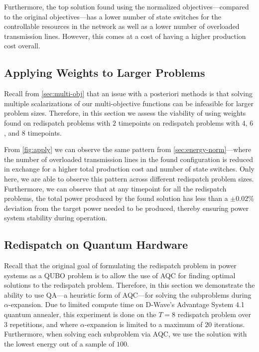 \documentclass[conference]{IEEEtran}
\makeatletter
\newcommand{\QUBO}{\textsc{QUBO}\@\xspace}
\makeatother
\begin{document}
Furthermore, the top solution found using the normalized
objectives---compared to the original objectives---has a lower number of
state switches for the controllable resources in the network as well as
a lower number of overloaded transmission lines. However, this comes at
a cost of having a higher production cost overall.

\subsection{Applying Weights to Larger Problems}\label{sec:SimBench}
Recall from \cref{sec:multi-obj} that an issue with a posteriori methods
is that solving multiple scalarizations of our multi-objective functions
can be infeasible for larger problem sizes. Therefore, in this section we
assess the viability of using weights found on redispatch problems
with $2$ timepoints on redispatch problems with $4$, $6$, and $8$
timepoints.

From \cref{fig:apply} we can observe the same pattern from
\cref{sec:energy-norm}---where the number of overloaded transmission
lines in the found configuration is reduced in exchange for a higher
total production cost and number of state switches. Only here, we are
able to observe this pattern across different redispatch problem
sizes. Furthermore, we can observe that at any timepoint for all the
redispatch problems, the total power produced by the found solution has
less than a $\pm{0.02}\%$ deviation from the target power needed to be
produced, thereby ensuring power system stability during operation.

\subsection{Redispatch on Quantum Hardware}\label{sec:compare-solver}
Recall that the original goal of formulating the redispatch problem in
power systems as a {\QUBO} problem is to allow the use of AQC for
finding optimal solutions to the redispatch problem. Therefore, in this
section we demonstrate the ability to use QA---a heuristic form of
AQC---for solving the subproblems during $\alpha$-expansion. Due to
limited compute time on D-Wave's Advantage System 4.1 quantum annealer,
this experiment is done on the $T=8$ redispatch problem over $3$
repetitions, and where $\alpha$-expansion is limited to a maximum of
$20$ iterations. Furthermore, when solving each subproblem via AQC, we
use the solution with the lowest energy out of a sample of $100$.
\end{document}
